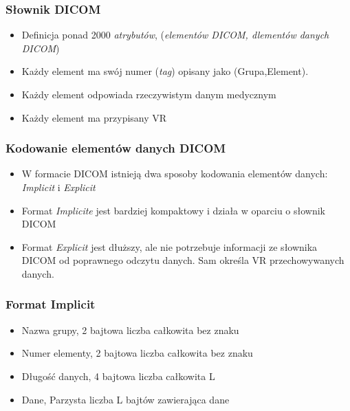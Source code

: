 \documentclass{beamer}
\begin{document}

\begin{frame}
    \frametitle{Słownik DICOM}
\begin{itemize}
  \item Definicja ponad 2000 \emph{atrybutów}, (\emph{elementów DICOM, dlementów danych DICOM})
  \item Każdy element ma swój numer (\emph{tag}) opisany jako (Grupa,Element).
  \item Każdy element odpowiada rzeczywistym danym medycznym
  \item Każdy element ma przypisany VR
\end{itemize}
\end{frame}


\begin{frame}
    \frametitle{Kodowanie elementów danych DICOM}


\begin{itemize}
  \item W formacie DICOM istnieją dwa sposoby kodowania elementów danych: \emph{Implicit} i \emph{Explicit}
  \item Format \emph{Implicite} jest bardziej kompaktowy i działa w oparciu o słownik DICOM
  \item Format \emph{Explicit} jest dłuższy, ale nie potrzebuje informacji ze słownika DICOM od poprawnego odczytu danych. Sam określa VR przechowywanych danych.
\end{itemize}
\end{frame}


\begin{frame}
    \frametitle{Format Implicit}
\begin{itemize}
  \item Nazwa grupy, 2 bajtowa liczba całkowita bez znaku
  \item Numer elementy, 2 bajtowa liczba całkowita bez znaku
  \item Długość danych, 4 bajtowa liczba całkowita L
  \item Dane, Parzysta liczba L bajtów zawierająca dane  
\end{itemize}
\end{frame}
\end{document}
